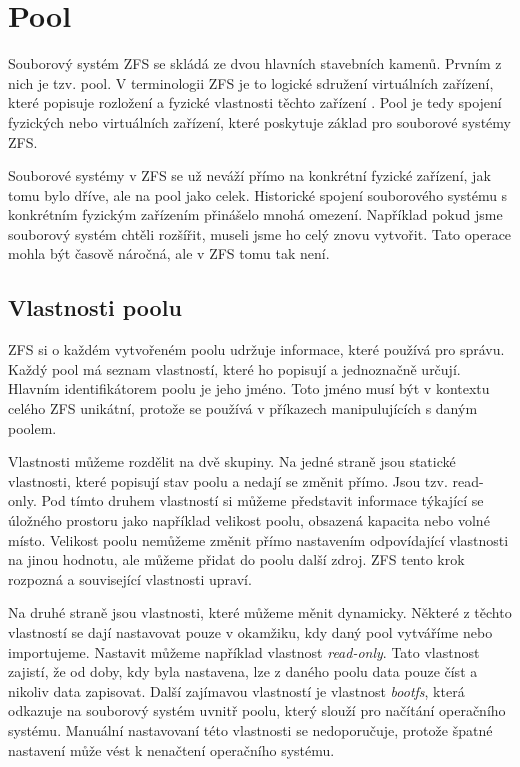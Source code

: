 \section{Pool}
Souborový systém ZFS se skládá ze dvou hlavních stavebních kamenů. Prvním z nich je tzv. pool. V terminologii ZFS je to logické sdružení virtuálních zařízení, které popisuje rozložení a fyzické vlastnosti těchto zařízení \cite{terminology}. Pool je tedy spojení fyzických nebo virtuálních zařízení, které poskytuje základ pro souborové systémy ZFS.

Souborové systémy v ZFS se už neváží přímo na konkrétní fyzické zařízení, jak tomu bylo dříve, ale na pool jako celek. Historické spojení souborového systému s konkrétním fyzickým zařízením přinášelo mnohá omezení. Například pokud jsme souborový systém chtěli rozšířit, museli jsme ho celý znovu vytvořit. Tato operace mohla být časově náročná, ale v ZFS tomu tak není.
\subsection{Vlastnosti poolu}
ZFS si o každém vytvořeném poolu udržuje informace, které používá pro správu. Každý pool má seznam vlastností, které ho popisují a jednoznačně určují.
Hlavním identifikátorem poolu je jeho jméno. Toto jméno musí být v kontextu celého ZFS unikátní, protože se používá v příkazech manipulujících s daným poolem.

Vlastnosti můžeme rozdělit na dvě skupiny. Na jedné straně jsou statické vlastnosti, které popisují stav poolu a nedají se změnit přímo. Jsou tzv. read-only. Pod tímto druhem vlastností si můžeme představit informace týkající se úložného prostoru jako například velikost poolu, obsazená kapacita nebo volné místo. Velikost poolu nemůžeme změnit přímo nastavením odpovídající vlastnosti na jinou hodnotu, ale můžeme přidat do poolu další zdroj. ZFS tento krok rozpozná a související vlastnosti upraví.

Na druhé straně jsou vlastnosti, které můžeme měnit dynamicky. Některé z těchto vlastností se dají nastavovat pouze v okamžiku, kdy daný pool vytváříme nebo importujeme. Nastavit můžeme například vlastnost \emph{read-only}. Tato vlastnost zajistí, že od doby, kdy byla nastavena, lze z daného poolu data pouze číst a nikoliv data zapisovat. Další zajímavou vlastností je vlastnost \emph{bootfs}, která odkazuje na souborový systém uvnitř poolu, který slouží pro načítání operačního systému. Manuální nastavovaní této vlastnosti se nedoporučuje, protože špatné nastavení může vést k nenačtení operačního systému.

